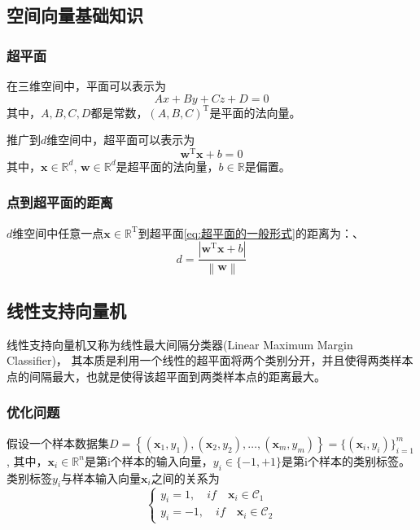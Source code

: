 \documentclass[withoutpreface,bwprint]{NoteBook}
\begin{document}
\subsection{空间向量基础知识}
\subsubsection{超平面}
在三维空间中，平面可以表示为
$$
Ax + By + Cz + D = 0
$$
其中，$A,B,C,D$都是常数，$(A,B,C)^\mathrm{T}$是平面的法向量。

推广到$d$维空间中，超平面可以表示为
\begin{equation}
    \label{eq:超平面的一般形式}
    \mathbf{w}^\mathrm{T} \mathbf{x} + b = 0
\end{equation}
其中，$\mathbf{x} \in \mathbb{R}^d$, $\mathbf{w} \in \mathbb{R}^d$是超平面的法向量，$b \in \mathbb{R}$是偏置。

\subsubsection{点到超平面的距离}
$d$维空间中任意一点$\mathbf{x} \in \mathbb{R}^\mathrm{T}$到超平面\cref{eq:超平面的一般形式}的距离为：、
\begin{equation}
    \label{eq:点到超平面的距离}
    d = \frac{ \left| \mathbf{w}^\mathrm{T}\mathbf{x}+b \right| }{ \left \| \mathbf{w} \right \|   }
\end{equation}

\subsection{线性支持向量机}
线性支持向量机又称为线性最大间隔分类器(Linear Maximum Margin Classifier)，
其本质是利用一个线性的超平面将两个类别分开，并且使得两类样本点的间隔最大，也就是使得该超平面到两类样本点的距离最大。

\subsubsection{优化问题}
假设一个样本数据集$D=\left\{ (\mathbf{x}_1,y_1), (\mathbf{x}_2,y_2),\dots, (\mathbf{x}_m,y_m) \right\} = \{ (\mathbf{x}_i,y_i) \}_{i=1}^{m}$,
其中，$\mathbf{x}_i \in \mathbb{R}^n$是第i个样本的输入向量，$y_i \in \{-1, +1\}$是第i个样本的类别标签。
类别标签$y_i$与样本输入向量$\mathbf{x}_i$之间的关系为
$$
\begin{cases}
    y_i = 1, \quad if \quad \mathbf{x}_i \in \mathcal{C}_1 \\
    y_i = -1, \quad if \quad \mathbf{x}_i \in \mathcal{C}_2
\end{cases}
$$
\end{document}
